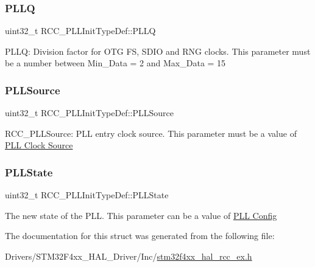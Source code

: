 \subsubsection{\texorpdfstring{P\+L\+LQ}{PLLQ}}
{\footnotesize\ttfamily uint32\+\_\+t R\+C\+C\+\_\+\+P\+L\+L\+Init\+Type\+Def\+::\+P\+L\+LQ}

P\+L\+LQ\+: Division factor for O\+TG FS, S\+D\+IO and R\+NG clocks. This parameter must be a number between Min\+\_\+\+Data = 2 and Max\+\_\+\+Data = 15 \mbox{\label{struct_r_c_c___p_l_l_init_type_def_a72806832a179af8756b9330de7f7c6a8}} 
\subsubsection{\texorpdfstring{P\+L\+L\+Source}{PLLSource}}
{\footnotesize\ttfamily uint32\+\_\+t R\+C\+C\+\_\+\+P\+L\+L\+Init\+Type\+Def\+::\+P\+L\+L\+Source}

R\+C\+C\+\_\+\+P\+L\+L\+Source\+: P\+LL entry clock source. This parameter must be a value of \hyperlink{group___r_c_c___p_l_l___clock___source}{P\+LL Clock Source} \mbox{\label{struct_r_c_c___p_l_l_init_type_def_a6cbaf84f6566af15e6e4f97a339d5759}} 
\subsubsection{\texorpdfstring{P\+L\+L\+State}{PLLState}}
{\footnotesize\ttfamily uint32\+\_\+t R\+C\+C\+\_\+\+P\+L\+L\+Init\+Type\+Def\+::\+P\+L\+L\+State}

The new state of the P\+LL. This parameter can be a value of \hyperlink{group___r_c_c___p_l_l___config}{P\+LL Config} 

The documentation for this struct was generated from the following file\+:\begin{DoxyCompactItemize}
\item 
Drivers/\+S\+T\+M32\+F4xx\+\_\+\+H\+A\+L\+\_\+\+Driver/\+Inc/\hyperlink{stm32f4xx__hal__rcc__ex_8h}{stm32f4xx\+\_\+hal\+\_\+rcc\+\_\+ex.\+h}\end{DoxyCompactItemize}
